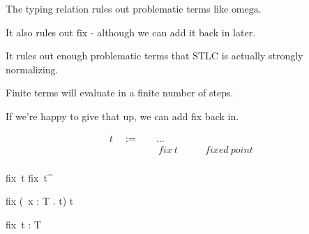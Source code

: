 \begin{frame}
  The typing relation rules out problematic terms like $\text{omega}$.
\end{frame}

\begin{frame}
  It also rules out $\text{fix}$ - although we can add it back in later.
\end{frame}

\begin{frame}
  It rules out enough problematic terms that $\text{STLC}$ is actually strongly normalizing.
\end{frame}

\begin{frame}
  Finite terms will evaluate in a finite number of steps.
\end{frame}

\begin{frame}
  If we're happy to give that up, we can add fix back in.
\end{frame}

\begin{frame}
  \begin{mdframed}[frametitle={Terms}]
\begin{displaymath}
    \begin{aligned}
t \quad:=\quad& \ldots &\\
  & ~ fix~t \quad\quad &fixed~point\\
    \end{aligned}
\end{displaymath}
  \end{mdframed}
\end{frame}

\begin{frame}
  \begin{mdframed}[frametitle={Small-step semantics}]

  {fix~t \longrightarrow fix~t^{\prime}}

  \infrule[E-FixBeta]
  {}
  {fix
    \left(\lambda~x {:} T . t\right)
    \longrightarrow {}t}

  \end{mdframed}
\end{frame}

\begin{frame}
  \begin{mdframed}[frametitle={Typing rules}]

  {\vdash fix~t {:} T}

  \end{mdframed}
\end{frame}

